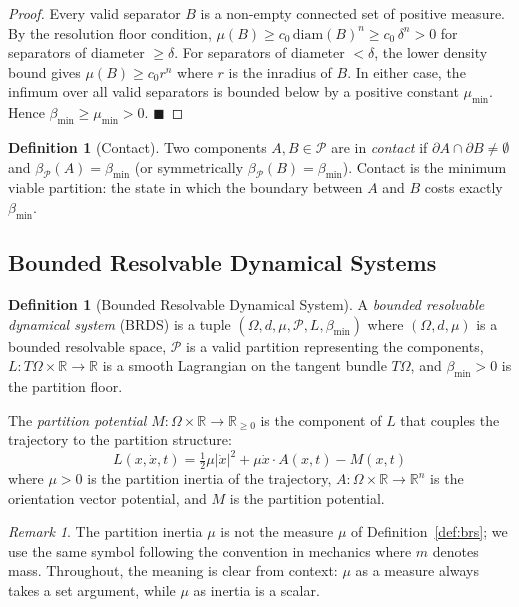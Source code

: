 \documentclass[11pt,twocolumn,a4paper]{article}
\theoremstyle{plain}
\theoremstyle{definition}
\newtheorem{definition}[theorem]{Definition}
\theoremstyle{remark}
\newtheorem{remark}[theorem]{Remark}
\newcommand{\bmin}{\beta_{\min}}
\newcommand{\reals}{\mathbb{R}}
\newcommand{\mumin}{\mu_{\min}}
\newcommand{\Pcal}{\mathcal{P}}
\newcommand{\half}{\tfrac{1}{2}}
\renewcommand{\qed}{\hfill$\blacksquare$}
\begin{document}
\begin{proof}
Every valid separator $B$ is a non-empty connected set of positive measure.
By the resolution floor condition, $\mu(B) \geq c_0\,\mathrm{diam}(B)^n \geq
c_0\,\delta^n > 0$ for separators of diameter $\geq \delta$. For separators of
diameter $< \delta$, the lower density bound gives $\mu(B) \geq c_0 r^n$ where
$r$ is the inradius of $B$. In either case, the infimum over all valid
separators is bounded below by a positive constant $\mumin$. Hence $\bmin \geq
\mumin > 0$. \qed
\end{proof}

\begin{definition}[Contact]
\label{def:contact}
Two components $A, B \in \Pcal$ are in \emph{contact} if $\partial A \cap
\partial B \neq \emptyset$ and $\beta_\Pcal(A) = \bmin$ (or symmetrically
$\beta_\Pcal(B) = \bmin$). Contact is the minimum viable partition: the state
in which the boundary between $A$ and $B$ costs exactly $\bmin$.
\end{definition}

\subsection{Bounded Resolvable Dynamical Systems}

\begin{definition}[Bounded Resolvable Dynamical System]
\label{def:brds}
A \emph{bounded resolvable dynamical system} (BRDS) is a tuple
$(\Omega, d, \mu, \Pcal, L, \bmin)$ where $(\Omega, d, \mu)$ is a bounded
resolvable space, $\Pcal$ is a valid partition representing the components,
$L: T\Omega \times \reals \to \reals$ is a smooth Lagrangian on the tangent
bundle $T\Omega$, and $\bmin > 0$ is the partition floor.

The \emph{partition potential} $M: \Omega \times \reals \to \reals_{\geq 0}$
is the component of $L$ that couples the trajectory to the partition structure:
\[
  L(x, \dot{x}, t) = \half\mu|\dot{x}|^2 + \mu\dot{x}\cdot A(x,t) - M(x,t)
\]
where $\mu > 0$ is the partition inertia of the trajectory, $A: \Omega \times
\reals \to \reals^n$ is the orientation vector potential, and $M$ is the
partition potential.
\end{definition}

\begin{remark}
The partition inertia $\mu$ is not the measure $\mu$ of Definition~\ref{def:brs};
we use the same symbol following the convention in mechanics where $m$ denotes
mass. Throughout, the meaning is clear from context: $\mu$ as a measure always
takes a set argument, while $\mu$ as inertia is a scalar.
\end{remark}
\end{document}
